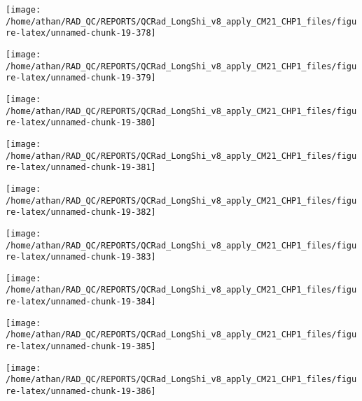 \documentclass[
  10pt,
  a4paper,oneside]{article}
\begin{document}
\begin{center}\texttt{[image: /home/athan/RAD\_QC/REPORTS/QCRad\_LongShi\_v8\_apply\_CM21\_CHP1\_files/figure-latex/unnamed-chunk-19-378]} \end{center}

\begin{center}\texttt{[image: /home/athan/RAD\_QC/REPORTS/QCRad\_LongShi\_v8\_apply\_CM21\_CHP1\_files/figure-latex/unnamed-chunk-19-379]} \end{center}

\begin{center}\texttt{[image: /home/athan/RAD\_QC/REPORTS/QCRad\_LongShi\_v8\_apply\_CM21\_CHP1\_files/figure-latex/unnamed-chunk-19-380]} \end{center}

\begin{center}\texttt{[image: /home/athan/RAD\_QC/REPORTS/QCRad\_LongShi\_v8\_apply\_CM21\_CHP1\_files/figure-latex/unnamed-chunk-19-381]} \end{center}

\begin{center}\texttt{[image: /home/athan/RAD\_QC/REPORTS/QCRad\_LongShi\_v8\_apply\_CM21\_CHP1\_files/figure-latex/unnamed-chunk-19-382]} \end{center}

\begin{center}\texttt{[image: /home/athan/RAD\_QC/REPORTS/QCRad\_LongShi\_v8\_apply\_CM21\_CHP1\_files/figure-latex/unnamed-chunk-19-383]} \end{center}

\begin{center}\texttt{[image: /home/athan/RAD\_QC/REPORTS/QCRad\_LongShi\_v8\_apply\_CM21\_CHP1\_files/figure-latex/unnamed-chunk-19-384]} \end{center}

\begin{center}\texttt{[image: /home/athan/RAD\_QC/REPORTS/QCRad\_LongShi\_v8\_apply\_CM21\_CHP1\_files/figure-latex/unnamed-chunk-19-385]} \end{center}

\begin{center}\texttt{[image: /home/athan/RAD\_QC/REPORTS/QCRad\_LongShi\_v8\_apply\_CM21\_CHP1\_files/figure-latex/unnamed-chunk-19-386]} \end{center}
\end{document}
